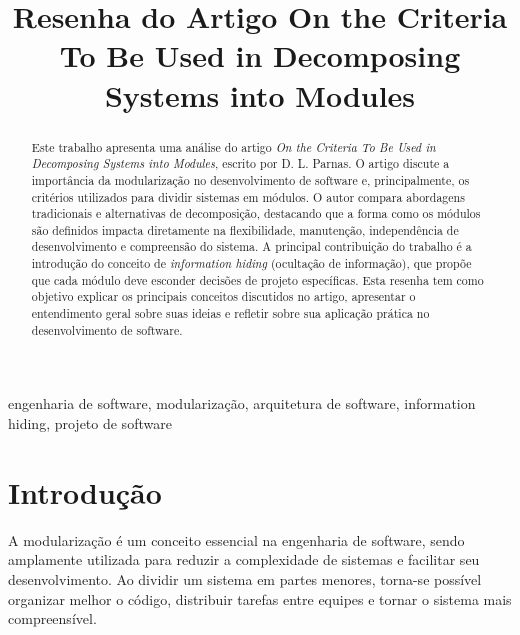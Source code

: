 \documentclass[conference]{IEEEtran}
\begin{document}
\title{Resenha do Artigo On the Criteria To Be Used in Decomposing Systems into Modules}

\author{
}

\maketitle

\begin{abstract}

Este trabalho apresenta uma análise do artigo \textit{On the Criteria To Be Used in Decomposing Systems into Modules}, escrito por D. L. Parnas. O artigo discute a importância da modularização no desenvolvimento de software e, principalmente, os critérios utilizados para dividir sistemas em módulos. O autor compara abordagens tradicionais e alternativas de decomposição, destacando que a forma como os módulos são definidos impacta diretamente na flexibilidade, manutenção, independência de desenvolvimento e compreensão do sistema. A principal contribuição do trabalho é a introdução do conceito de \textit{information hiding} (ocultação de informação), que propõe que cada módulo deve esconder decisões de projeto específicas. Esta resenha tem como objetivo explicar os principais conceitos discutidos no artigo, apresentar o entendimento geral sobre suas ideias e refletir sobre sua aplicação prática no desenvolvimento de software.

\end{abstract}

\begin{IEEEkeywords}
engenharia de software, modularização, arquitetura de software, information hiding, projeto de software
\end{IEEEkeywords}

\section{Introdução}

A modularização é um conceito essencial na engenharia de software, sendo amplamente utilizada para reduzir a complexidade de sistemas e facilitar seu desenvolvimento. Ao dividir um sistema em partes menores, torna-se possível organizar melhor o código, distribuir tarefas entre equipes e tornar o sistema mais compreensível.
\end{document}
